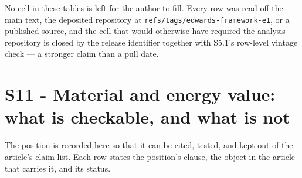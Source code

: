 \documentclass[11pt]{article}
\begin{document}
No cell in these tables is left for the author to fill. Every row was read off the main text, the deposited repository at \texttt{refs/\allowbreak{}tags/\allowbreak{}edwards-\allowbreak{}framework-\allowbreak{}e1}, or a published source, and the cell that would otherwise have required the analysis repository is closed by the release identifier together with S5.1's row-level vintage check --- a stronger claim than a pull date.

\section*{S11 - Material and energy value: what is checkable, and what is not}\label{s11---material-and-energy-value-what-is-checkable-and-what-is-not}

The position is recorded here so that it can be cited, tested, and kept out of the article's claim list. Each row states the position's clause, the object in the article that carries it, and its status.
\end{document}
